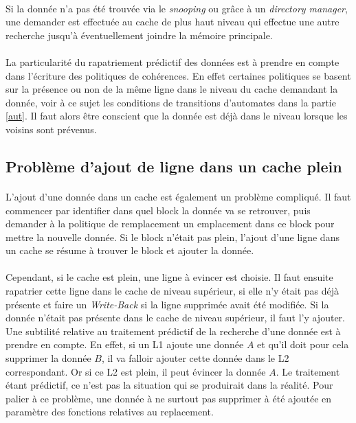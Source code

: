 \paragraph{}
Si la donnée n'a pas été trouvée via le \emph{snooping} ou grâce à un \emph{directory manager}, une demander est effectuée au cache de plus haut niveau qui effectue une autre recherche jusqu'à éventuellement joindre la mémoire principale.

\paragraph{}
La particularité du rapatriement prédictif des données est à prendre en compte dans l'écriture des politiques de cohérences. En effet certaines politiques se basent sur la présence ou non de la même ligne dans le niveau du cache demandant la donnée, voir à ce sujet les conditions de transitions d'automates dans la partie \ref{aut}. Il faut alors être conscient que la donnée est déjà dans le niveau lorsque les voisins sont prévenus.

\subsection{Problème d'ajout de ligne dans un cache plein}

\paragraph{}
L'ajout d'une donnée dans un cache est également un problème compliqué. Il faut commencer par identifier dans quel block la donnée va se retrouver, puis demander à la politique de remplacement un emplacement dans ce block pour mettre la nouvelle donnée. Si le block n'était pas plein, l'ajout d'une ligne dans un cache se résume à trouver le block et ajouter la donnée.

\paragraph{}
Cependant, si le cache est plein, une ligne à evincer est choisie. Il faut ensuite rapatrier cette ligne dans le cache de niveau supérieur, si elle n'y était pas déjà présente et faire un \emph{Write-Back} si la ligne supprimée avait été modifiée. Si la donnée n'était pas présente dans le cache de niveau supérieur, il faut l'y ajouter. Une subtilité relative au traitement prédictif de la recherche d'une donnée est à prendre en compte. En effet, si un L1 ajoute une donnée $A$ et qu'il doit pour cela supprimer la donnée $B$, il va falloir ajouter cette donnée dans le L2 correspondant. Or si ce L2 est plein, il peut évincer la donnée $A$. Le traitement étant prédictif, ce n'est pas la situation qui se produirait dans la réalité. Pour palier à ce problème, une donnée à ne surtout pas supprimer à été ajoutée en paramètre des fonctions relatives au replacement.



